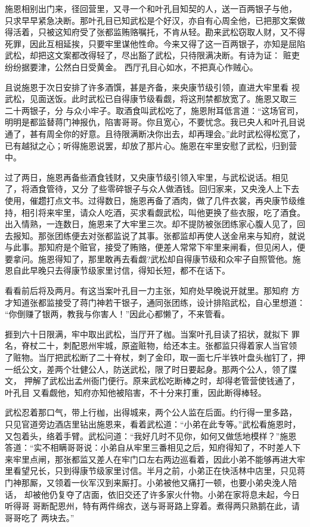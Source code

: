 施恩相别出门来，径回营里，又寻一个和叶孔目知契的人，送一百两银子与他，
只求早早紧急决断。那叶孔目已知武松是个好汉，亦自有心周全他，已把那文案做
得活着，只被这知府受了张都监贿赂嘱托，不肯从轻。勘来武松窃取人财，又不得
死罪，因此互相延挨，只要牢里谋他性命。今来又得了这一百两银子，亦知是屈陷
武松，却把这文案都改得轻了，尽出豁了武松，只待限满决断。有诗为证：
赃吏纷纷据要津，公然白日受黄金。
西厅孔目心如水，不把真心作贼心。

且说施恩于次日安排了许多酒馔，甚是齐备，来央康节级引领，直进大牢里看
视武松，见面送饭。此时武松已自得康节级看觑，将这刑禁都放宽了。施恩又取三
二十两银子，分与众小牢子。取酒食叫武松吃了，施恩附耳低言道：“这场官司，
明明是都监替蒋门神报仇，陷害哥哥。你且宽心，不要忧念。我已央人和叶孔目说
通了，甚有周全你的好意。且待限满断决你出去，却再理会。”此时武松得松宽了，
已有越狱之心；听得施恩说罢，却放了那片心。施恩在牢里安慰了武松，归到营中。

过了两日，施恩再备些酒食钱财，又央康节级引领入牢里，与武松说话。相见
了，将酒食管待，又分了些零碎银子与众人做酒钱。回归家来，又央浼人上下去
使用，催趱打点文书。过得数日，施恩再备了酒肉，做了几件衣裳，再央康节级维
持，相引将来牢里，请众人吃酒，买求看觑武松，叫他更换了些衣服，吃了酒食。
出入情熟，一连数日，施恩来了大牢里三次。却不提防被张团练家心腹人见了，回
去报知。那张团练便去对张都监说了其事。张都监却再使人送金帛来与知府，就说
与此事。那知府是个赃官，接受了贿赂，便差人常常下牢里来闸看，但见闲人，便
要拿问。施恩得知了，那里敢再去看觑?武松却自得康节级和众牢子自照管他。施
恩自此早晚只去得康节级家里讨信，得知长短，都不在话下。

看看前后将及两月。有这当案叶孔目一力主张，知府处早晚说开就里。那知府
方才知道张都监接受了蒋门神若干银子，通同张团练，设计排陷武松，自心里想道：
“你倒赚了银两，教我与你害人！”因此心都懒了，不来管看。

捱到六十日限满，牢中取出武松，当厅开了枷。当案叶孔目读了招状，就拟下
罪名，脊杖二十，刺配恩州牢城，原盗赃物，给还本主。张都监只得着家人当官领
了赃物。当厅把武松断了二十脊杖，刺了金印，取一面七斤半铁叶盘头枷钉了，押
一纸公文，差两个壮健公人，防送武松，限了时日要起身。那两个公人，领了牒文，
押解了武松出孟州衙门便行。原来武松吃断棒之时，却得老管营使钱通了，叶孔目
又看觑他，知府亦知他被陷害，不十分来打重，因此断得棒轻。

武松忍着那口气，带上行枷，出得城来，两个公人监在后面。约行得一里多路，
只见官道旁边酒店里钻出施恩来，看着武松道：“小弟在此专等。”武松看施恩时，
又包着头，络着手臂。武松问道：“我好几时不见你，如何又做恁地模样？”施恩
答道：“实不相瞒哥哥说：小弟自从牢里三番相见之后，知府得知了，不时差人下
来牢里点闸，那张都监又差人在牢门口左右两边巡看着，因此小弟不能够再进大牢
里看望兄长，只到得康节级家里讨信。半月之前，小弟正在快活林中店里，只见蒋
门神那厮，又领着一伙军汉到来厮打。小弟被他又痛打一顿，也要小弟央浼人陪话，
却被他仍复夺了店面，依旧交还了许多家火什物。小弟在家将息未起，今日听得哥
哥断配恩州，特有两件绵衣，送与哥哥路上穿着。煮得两只熟鹅在此，请哥哥吃了
两块去。”

